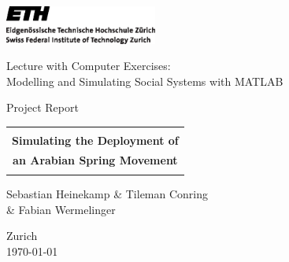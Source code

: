 \thispagestyle{empty}

\begin{center}
\includegraphics[width=5cm]{./titlepage/ETHlogo.eps}

\bigskip


\bigskip


\bigskip


\LARGE{ 	Lecture with Computer Exercises:\\ }
\LARGE{ Modelling and Simulating Social Systems with MATLAB\\}

\bigskip

\bigskip

\small{Project Report}\\

\bigskip

\bigskip

\bigskip

\bigskip


\begin{tabular}{|c|}
\hline
\\
\textbf{\LARGE{Simulating the Deployment of}}\\[1ex]
\textbf{\LARGE{an Arabian Spring Movement}}\\
\\
\hline
\end{tabular}
\bigskip

\bigskip

\bigskip

\LARGE{Sebastian Heinekamp \& Tileman Conring \\ \& Fabian Wermelinger}



\bigskip

\bigskip

\bigskip

\bigskip

\bigskip

\bigskip

\bigskip

\bigskip

Zurich\\
\today\\

\end{center}
